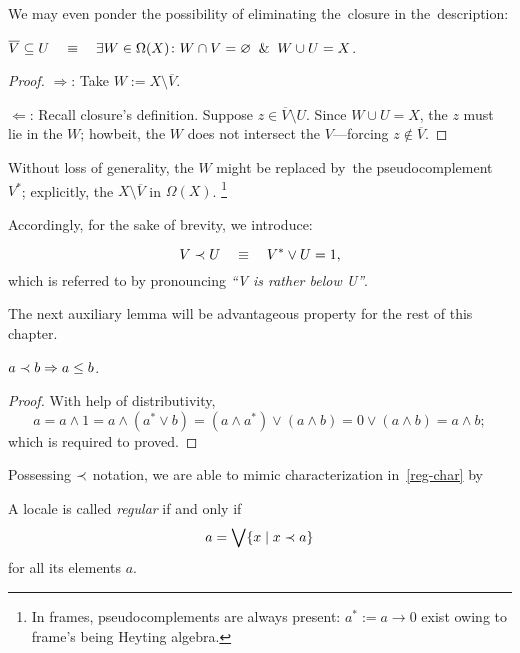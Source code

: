 We may even ponder the possibility of eliminating the~closure in
the~description:

\begin{lem}
  $\overline{V}\subseteq U \quad \equiv \quad \exists W\in \Omega(X)\colon W \cap V =
  \varnothing \;\; \& \;\; W \cup U = X$.
\end{lem}
\begin{proof}
  $\Rightarrow$:
  Take $W := X\setminus \overline{V}$.

  $\Leftarrow$:
  Recall closure's definition.
  Suppose $z\in \overline{V}\setminus U$.
  Since $W \cup U = X$, the $z$ must lie in the $W$;
  howbeit, the $W$ does not intersect the $V$---forcing $z\not\in
  \overline{V}$.
\end{proof}

Without loss of generality, the $W$ might be replaced by~the
pseudocomplement~$V^*$;
explicitly, the $X\setminus \overline{V}$ in $\Omega(X)$.%
\footnote{In frames, pseudocomplements are always present: $a^* := a
\rightarrow 0$ exist owing to frame's being Heyting algebra.}

Accordingly, for the sake of brevity, we introduce:
\begin{framed}
  \begin{nota}[$\rb$]
    \[
      V \prec U \quad \equiv \quad V^* \vee U = 1,
    \]
    which is referred to by pronouncing \emph{``V is rather below U''\/}.
  \end{nota}
\end{framed}

The next auxiliary lemma will be advantageous property for the rest of this
chapter.
\begin{lem} \label{rb->leq}
  $a \prec b \Rightarrow a \leq b$.
\end{lem}
\begin{proof}
  With help of distributivity,
  \[
    a = a \wedge 1 = a \wedge (a^* \vee b) = (a \wedge a^*) \vee (a \wedge b) =
    0 \vee (a \wedge b) = a \wedge b;
  \]
  which is required to proved.
\end{proof}

Possessing $\rb$ notation, we are able to mimic characterization
in~\ref{reg-char} by
\begin{framed}
  \begin{df}[Reg]
    A locale is called \emph{regular\/} if and only if
    \[
      a = \bigvee \{x \mid x \prec a\}
    \]
    for all its elements $a$.
  \end{df}
\end{framed}

